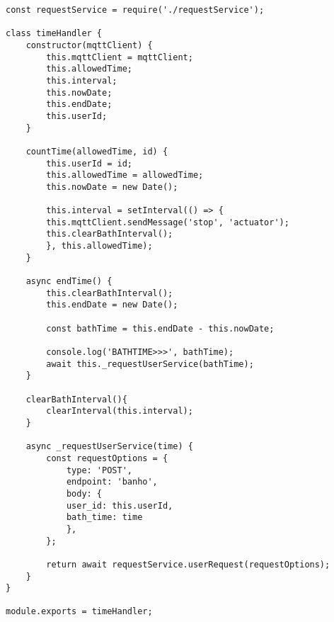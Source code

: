 \begin{lstlisting}[caption=Exemplo do código responsável por lidar com informações do tempo de banho]
const requestService = require('./requestService');

class timeHandler {
	constructor(mqttClient) {
		this.mqttClient = mqttClient;
		this.allowedTime;
		this.interval;
		this.nowDate;
		this.endDate;
		this.userId;
	}
	
	countTime(allowedTime, id) {
		this.userId = id;
		this.allowedTime = allowedTime;
		this.nowDate = new Date();
		
		this.interval = setInterval(() => {
		this.mqttClient.sendMessage('stop', 'actuator');
		this.clearBathInterval();
		}, this.allowedTime);
	}
	
	async endTime() {
		this.clearBathInterval();
		this.endDate = new Date();
		
		const bathTime = this.endDate - this.nowDate;
		
		console.log('BATHTIME>>>', bathTime);
		await this._requestUserService(bathTime);
	}
	
	clearBathInterval(){
		clearInterval(this.interval);
	}
	
	async _requestUserService(time) {
		const requestOptions = {
			type: 'POST',
			endpoint: 'banho',
			body: {
			user_id: this.userId,
			bath_time: time
			},
		};
		
		return await requestService.userRequest(requestOptions);
	}
}

module.exports = timeHandler;
\end{lstlisting}

\newpage

